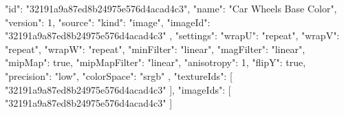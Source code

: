 {
  "id": "32191a9a87ed8b24975e576d4acad4c3",
  "name": "Car Wheels Base Color",
  "version": 1,
  "source": {
    "kind": "image",
    "imageId": "32191a9a87ed8b24975e576d4acad4c3"
  },
  "settings": {
    "wrapU": "repeat",
    "wrapV": "repeat",
    "wrapW": "repeat",
    "minFilter": "linear",
    "magFilter": "linear",
    "mipMap": true,
    "mipMapFilter": "linear",
    "anisotropy": 1,
    "flipY": true,
    "precision": "low",
    "colorSpace": "srgb"
  },
  "textureIds": [
    "32191a9a87ed8b24975e576d4acad4c3"
  ],
  "imageIds": [
    "32191a9a87ed8b24975e576d4acad4c3"
  ]
}
